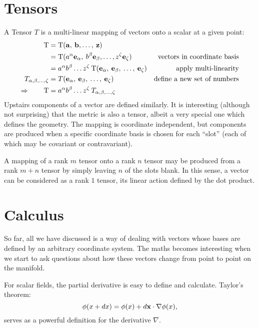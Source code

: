 \section{Tensors}
A Tensor $T$ is a multi-linear mapping of vectors onto a scalar at a given point:
\begin{align}
  \mathrm{T} 
  &= 
  \mathrm{T}(\mathbf{a},\:\mathbf{b},\ldots,\:\mathbf{z})
  &
  \nonumber
  \\
  &= 
  \mathrm{T}(a^\alpha\mathbf{e}_\alpha,\:b^\beta\mathbf{e}_\beta,\ldots,z^\zeta\mathbf{e}_\zeta)  
  &\text{vectors in coordinate basis}
  \nonumber
  \\
  &= 
  a^\alpha b^\beta \ldots z^\zeta \: 
  \mathrm{T}(\mathbf{e}_\alpha,\:\mathbf{e}_\beta,\:\ldots,\:\mathbf{e}_\zeta)  
  &\text{apply multi-linearity}
  \nonumber
  \\
  T_{\alpha,\beta,\ldots,\zeta} 
  &=  
  T(\mathbf{e}_\alpha,\:\mathbf{e}_\beta,\:\ldots,\:\mathbf{e}_\zeta)
  &\text{define a new set of numbers}
  \nonumber
  \\
  \Rightarrow\qquad
  \mathrm{T}
  &= 
  a^\alpha b^\beta \ldots z^\zeta \: 
  T_{\alpha,\beta,\ldots,\zeta}
  &
  \nonumber
\end{align}
Upstairs components of a vector are defined similarly. It is interesting (although not surprising) that the metric is also a tensor, albeit a very special one which defines the geometry. The mapping is coordinate independent, but components are produced when a specific coordinate basis is chosen for each ``slot'' (each of which may be covariant or contravariant).

A mapping of a rank $m$ tensor onto a rank $n$ tensor may be produced from a rank $m+n$ tensor by simply leaving $n$ of the slots blank. In this sense, a vector can be considered as a rank $1$ tensor, its linear action defined by the dot product.

\section{Calculus}
So far, all we have discussed is a way of dealing with vectors whose bases are defined by an arbitrary coordinate system. The maths becomes interesting when we start to ask questions about how these vectors change from point to point on the manifold.

For scalar fields, the partial derivative is easy to define and calculate. Taylor's theorem:
\begin{equation}
  \phi(x+dx) = \phi(x) + d\mathbf{x}\cdot\nabla\phi(x),
  \label{eqn:dg:taylor_scalar}
\end{equation}
serves as a powerful definition for the derivative $\nabla$.

